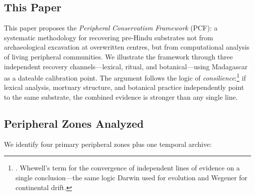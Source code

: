 \documentclass[12pt,a4paper]{article}
\begin{document}
\subsection{This Paper}

This paper proposes the \emph{Peripheral Conservatism Framework} (PCF): a systematic methodology for recovering pre-Hindu substrates not from archaeological excavation at overwritten centres, but from computational analysis of living peripheral communities. We illustrate the framework through three independent recovery channels---lexical, ritual, and botanical---using Madagascar as a dateable calibration point. The argument follows the logic of \emph{consilience}:\footnote{\autocite{whewell1840philosophy}. Whewell's term for the convergence of independent lines of evidence on a single conclusion---the same logic Darwin used for evolution and Wegener for continental drift.} if lexical analysis, mortuary structure, and botanical practice independently point to the same substrate, the combined evidence is stronger than any single line.

\subsection{Peripheral Zones Analyzed}

We identify four primary peripheral zones plus one temporal archive:
\end{document}
